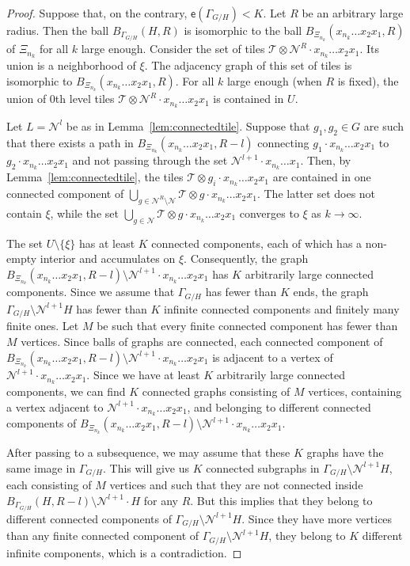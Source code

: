 \documentclass[11pt]{amsart}
\newcommand{\til}{\mathcal{T}}
\newcommand{\nuke}{\ensuremath{\mathcal{N}}}%
\newcommand{\esf}{\ensuremath{\mathsf{e}}}
\theoremstyle{definition}
\theoremstyle{plain}
\newtheorem{main thm}{Theorem}
\theoremstyle{remark}
\theoremstyle{plain}
\begin{document}
\begin{proof}
Suppose that, on the contrary, $\esf(\Gamma_{G/H})<K$. Let $R$ be an arbitrary large radius. Then the ball $B_{\Gamma_{G/H}}(H, R)$ is isomorphic to the ball $B_{\Xi_{n_k}}(x_{n_k}\ldots x_2x_1, R)$ of $\Xi_{n_k}$ for all $k$ large enough. Consider the set of tiles $ \til\otimes \nuke^R\cdot x_{n_k}\ldots x_2x_1$. Its union is a neighborhood of $\xi$. The adjacency graph of this set of tiles is isomorphic to $B_{\Xi_{n_k}}(x_{n_k}\ldots x_2x_1, R)$. For all $k$ large enough (when $R$ is fixed), the union of 0th level tiles $\til\otimes \nuke^R\cdot x_{n_k}\ldots x_2x_1$ is contained in $U$.  

Let $L=\nuke^l$ be as in Lemma~\ref{lem:connectedtile}. Suppose that $g_1, g_2\in G$ are such that there exists a path in $B_{\Xi_{n_k}}(x_{n_k}\ldots x_2x_1, R-l)$ connecting $g_1\cdot x_{n_k}\ldots x_2x_1$ to $g_2\cdot x_{n_k}\ldots x_2x_1$ and not passing through the set $\nuke^{l+1}\cdot x_{n_k}\ldots x_1$. Then, by Lemma~\ref{lem:connectedtile}, the tiles $\til\otimes g_i\cdot x_{n_k}\ldots x_2x_1$ are contained in one connected component of $\bigcup_{g\in \nuke^R\setminus\nuke}\til\otimes g\cdot x_{n_k}\ldots x_2x_1$. The latter set does not contain $\xi$, while the set $\bigcup_{g\in\nuke}\til\otimes g\cdot x_{n_k}\ldots x_2x_1$ converges to $\xi$ as $k\to\infty$. 

The set $U\setminus\{\xi\}$ has at least $K$ connected components, each of which has a non-empty interior and accumulates on $\xi$. Consequently, the graph $B_{\Xi_{n_k}}(x_{n_k}\ldots x_2x_1, R-l)\setminus\nuke^{l+1}\cdot x_{n_k}\ldots x_2x_1$ has $K$ arbitrarily large connected components. Since we assume that $\Gamma_{G/H}$ has fewer than $K$ ends, the graph $\Gamma_{G/H}\setminus \nuke^{l+1} H$ has fewer than $K$ infinite connected components and finitely many finite ones. Let $M$ be such that every finite connected component has fewer than $M$ vertices. Since balls of graphs are connected, each connected component of $B_{\Xi_{n_k}}(x_{n_k}\ldots x_2x_1, R-l)\setminus\nuke^{l+1}\cdot x_{n_k}\ldots x_2x_1$ is adjacent to a vertex of $\nuke^{l+1}\cdot x_{n_k}\ldots x_2x_1$. Since we have at least $K$ arbitrarily large connected components, we can find $K$ connected graphs consisting of $M$ vertices, containing a vertex adjacent to $\nuke^{l+1}\cdot x_{n_k}\ldots x_2x_1$, and belonging to different connected components of $B_{\Xi_{n_k}}(x_{n_k}\ldots x_2x_1, R-l)\setminus\nuke^{l+1}\cdot x_{n_k}\ldots x_2x_1$. 

After passing to a subsequence, we may assume that these $K$ graphs have the same image in $\Gamma_{G/H}$. This will give us $K$ connected subgraphs in $\Gamma_{G/H}\setminus\nuke^{l+1} H$, each consisting of $M$ vertices and such that they are not connected inside $B_{\Gamma_{G/H}}(H, R-l)\setminus\nuke^{l+1}\cdot H$ for any $R$. But this implies that they belong to different connected components of $\Gamma_{G/H}\setminus \nuke^{l+1} H$. Since they have more vertices than any finite connected component of $\Gamma_{G/H}\setminus \nuke^{l+1} H$, they belong to $K$ different infinite components, which is a contradiction.
\end{proof}
\end{document}
